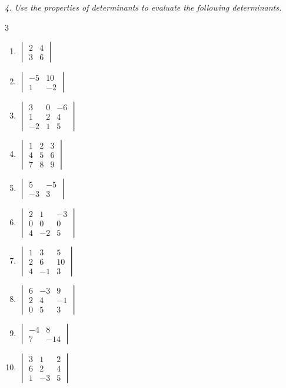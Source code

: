 \emph{4. Use the properties of determinants to evaluate the following determinants.}
\bigskip
\begin{multicols}{3}\raggedright
\begin{enumerate}[label=\arabic*.,  leftmargin=*]
\item $\begin{vmatrix} 2 & 4 \\ 3 & 6 \end{vmatrix}$
\item $\begin{vmatrix} -5 & 10 \\ 1 & -2 \end{vmatrix}$
\item $\begin{vmatrix} 3 & 0 & -6 \\ 1 & 2 & 4 \\ -2 & 1 & 5 \end{vmatrix}$
\item $\begin{vmatrix} 1 & 2 & 3 \\ 4 & 5 & 6 \\ 7 & 8 & 9 \end{vmatrix}$
\item $\begin{vmatrix} 5 & -5 \\ -3 & 3 \end{vmatrix}$
\item $\begin{vmatrix} 2 & 1 & -3 \\ 0 & 0 & 0 \\ 4 & -2 & 5 \end{vmatrix}$
\item $\begin{vmatrix} 1 & 3 & 5 \\ 2 & 6 & 10 \\ 4 & -1 & 3 \end{vmatrix}$
\item $\begin{vmatrix} 6 & -3 & 9 \\ 2 & 4 & -1 \\ 0 & 5 & 3 \end{vmatrix}$
\item $\begin{vmatrix} -4 & 8 \\ 7 & -14 \end{vmatrix}$
\item $\begin{vmatrix} 3 & 1 & 2 \\ 6 & 2 & 4 \\ 1 & -3 & 5 \end{vmatrix}$

\end{enumerate}
\end{multicols}
